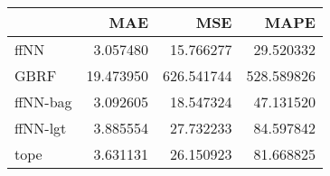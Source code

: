 \begin{tabular}{lrrr}
\toprule
{} &        MAE &         MSE &        MAPE \\
\midrule
ffNN     &   3.057480 &   15.766277 &   29.520332 \\
GBRF     &  19.473950 &  626.541744 &  528.589826 \\
ffNN-bag &   3.092605 &   18.547324 &   47.131520 \\
ffNN-lgt &   3.885554 &   27.732233 &   84.597842 \\
tope     &   3.631131 &   26.150923 &   81.668825 \\
\bottomrule
\end{tabular}
